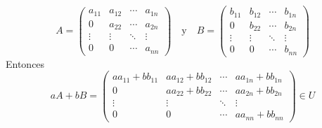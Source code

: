 \begin{ejercicio}
\begin{enumerate}
		      \begin{equation*}
			      A = \begin{pmatrix}
				      a_{11} & a_{12} & \cdots & a_{1n} \\
				      0      & a_{22} & \cdots & a_{2n} \\
				      \vdots & \vdots & \ddots & \vdots \\
				      0      & 0      & \cdots & a_{nn}
			      \end{pmatrix} \quad \text{y} \quad B =\begin{pmatrix}
				      b_{11} & b_{12} & \cdots & b_{1n} \\
				      0      & b_{22} & \cdots & b_{2n} \\
				      \vdots & \vdots & \ddots & \vdots \\
				      0      & 0      & \cdots & b_{nn}
			      \end{pmatrix}
		      \end{equation*}
		      Entonces
		      \begin{equation*}
			      aA + bB = \begin{pmatrix}
				      aa_{11} + bb_{11} & aa_{12} + bb_{12} & \cdots & aa_{1n} + bb_{1n} \\
				      0                 & aa_{22} + bb_{22} & \cdots & aa_{2n} + bb_{2n} \\
				      \vdots            & \vdots            & \ddots & \vdots            \\
				      0                 & 0                 & \cdots & aa_{nn} + bb_{nn}
			      \end{pmatrix} \in U
		      \end{equation*}
	\end{enumerate}
\end{ejercicio}


